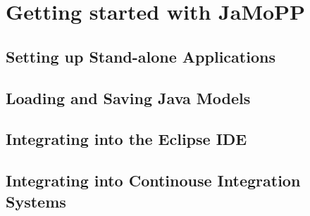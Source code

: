 \chapter{Getting started with JaMoPP}

\section{Setting up Stand-alone Applications}

\section{Loading and Saving Java Models}

\section{Integrating into the Eclipse IDE}

\section{Integrating into Continouse Integration Systems}

